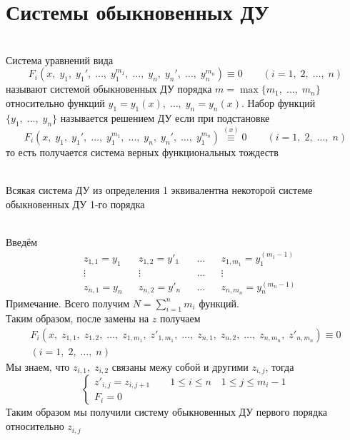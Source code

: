 \author{Tkachuk Andrei}

\section{Системы обыкновенных ДУ}

\begin{Def}~\\
    Система уравнений вида
    \[
        F_i(x,\; y_1,\; y_1',\; \dots,\; y_1^{m_1},\; \dots,\; y_n,\; y_n',\; \dots,\; y_n^{m_n}) \equiv 0 \qquad (i = 1,\; 2,\; \dots,\; n)
    \]
    называют системой обыкновенных ДУ порядка $m = \max\{m_1,\; \dots,\; m_n\}$ относительно функций 
    $y_1 = y_1(x),\; \dots,\; y_n = y_n(x)$. Набор функций $\{y_1,\; \dots,\; y_n\}$ называется решением ДУ если при подстановке 
    \[
        F_i(x,\; y_1,\; y_1',\; \dots,\; y_1^{m_1},\; \dots,\; y_n,\; y_n',\; \dots,\; y_1^{m_n}) \stackrel{(x)}{\equiv} 0 \qquad (i = 1,\; 2,\; \dots,\; n)
    \]
    то есть получается система верных функциональных тождеств 
\end{Def}

\begin{Th}~\\
    Всякая система ДУ из определения 1 эквивалентна некоторой системе обыкновенных ДУ 1-го порядка
\end{Th}

\begin{Proof}~\\
    Введём
    \begin{align*}
        & z_{1,1} = y_1 && z_{1,2} = y'_1 && \dots && z_{1,m_1} = y^{(m_1-1)}_1 \\
        &\vdots && \vdots && \dots && \vdots \\
        & z_{n,1} = y_n && z_{n,2} = y'_n && \dots && z_{n,m_n} = y^{(m_n-1)}_n
    \end{align*}
    Примечание. Всего получим $N = \sum_{i=1}^{n} m_i$ функций.\\
    Таким образом, после замены на $z$ получаем
    \begin{multline*}
        F_i(x,\; z_{1,1},\; z_{1,2},\; \dots,\; z_{1,m_1},\; z'_{1,m_1},\; \dots,\; z_{n,1},\; z_{n,2},\; \dots,\; z_{n,m_n},\; z'_{n,m_n}) \equiv 0\\
        (i = 1,\; 2,\; \dots,\; n)
    \end{multline*}
    Мы знаем, что $z_{i,1},\; z_{i,2}$ связаны межу собой и другими $z_{i,j}$, тогда
    \[
        \begin{cases}
            z'_{i,j} = z_{i,j + 1} \qquad 1\leqslant i \leqslant n \quad 1\leqslant j \leqslant m_i - 1\\
            F_i = 0
        \end{cases}
    \]
    Таким образом мы получили систему обыкновенных ДУ первого порядка относительно $z_{i,j}$ 
\end{Proof}

